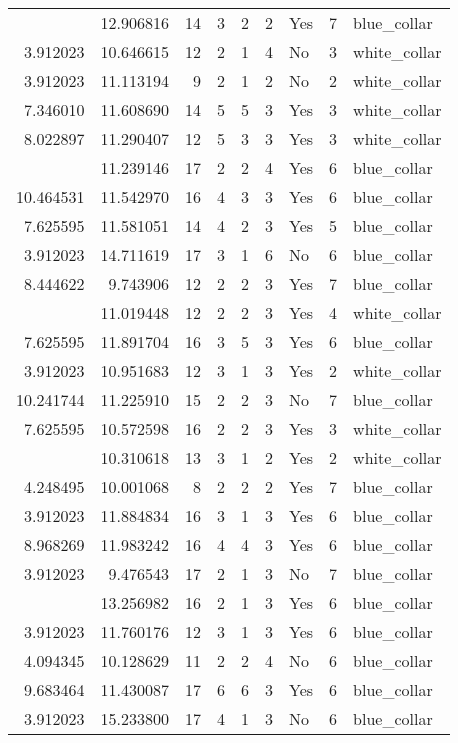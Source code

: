 \documentclass[
]{article}
\begin{document}
\begin{longtable}[t]{rrrrrllrl}
\addlinespace
10.758966 & 12.906816 & 14 & 3 & 2 & 2 & Yes & 7 & blue\_collar\\
3.912023 & 10.646615 & 12 & 2 & 1 & 4 & No & 3 & white\_collar\\
3.912023 & 11.113194 & 9 & 2 & 1 & 2 & No & 2 & white\_collar\\
7.346010 & 11.608690 & 14 & 5 & 5 & 3 & Yes & 3 & white\_collar\\
8.022897 & 11.290407 & 12 & 5 & 3 & 3 & Yes & 3 & white\_collar\\
\addlinespace
8.527143 & 11.239146 & 17 & 2 & 2 & 4 & Yes & 6 & blue\_collar\\
10.464531 & 11.542970 & 16 & 4 & 3 & 3 & Yes & 6 & blue\_collar\\
7.625595 & 11.581051 & 14 & 4 & 2 & 3 & Yes & 5 & blue\_collar\\
3.912023 & 14.711619 & 17 & 3 & 1 & 6 & No & 6 & blue\_collar\\
8.444622 & 9.743906 & 12 & 2 & 2 & 3 & Yes & 7 & blue\_collar\\
\addlinespace
4.382027 & 11.019448 & 12 & 2 & 2 & 3 & Yes & 4 & white\_collar\\
7.625595 & 11.891704 & 16 & 3 & 5 & 3 & Yes & 6 & blue\_collar\\
3.912023 & 10.951683 & 12 & 3 & 1 & 3 & Yes & 2 & white\_collar\\
10.241744 & 11.225910 & 15 & 2 & 2 & 3 & No & 7 & blue\_collar\\
7.625595 & 10.572598 & 16 & 2 & 2 & 3 & Yes & 3 & white\_collar\\
\addlinespace
3.912023 & 10.310618 & 13 & 3 & 1 & 2 & Yes & 2 & white\_collar\\
4.248495 & 10.001068 & 8 & 2 & 2 & 2 & Yes & 7 & blue\_collar\\
3.912023 & 11.884834 & 16 & 3 & 1 & 3 & Yes & 6 & blue\_collar\\
8.968269 & 11.983242 & 16 & 4 & 4 & 3 & Yes & 6 & blue\_collar\\
3.912023 & 9.476543 & 17 & 2 & 1 & 3 & No & 7 & blue\_collar\\
\addlinespace
3.912023 & 13.256982 & 16 & 2 & 1 & 3 & Yes & 6 & blue\_collar\\
3.912023 & 11.760176 & 12 & 3 & 1 & 3 & Yes & 6 & blue\_collar\\
4.094345 & 10.128629 & 11 & 2 & 2 & 4 & No & 6 & blue\_collar\\
9.683464 & 11.430087 & 17 & 6 & 6 & 3 & Yes & 6 & blue\_collar\\
3.912023 & 15.233800 & 17 & 4 & 1 & 3 & No & 6 & blue\_collar\\

\end{longtable}
\end{document}
